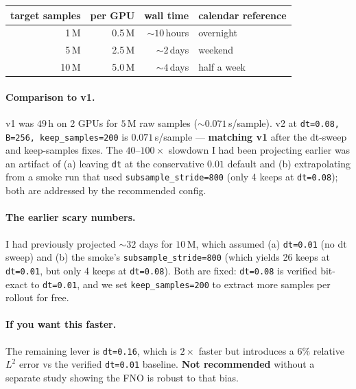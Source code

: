 \documentclass[11pt]{article}
\begin{document}
\begin{center}
\begin{tabular}{rrrl}
\toprule
target samples & per GPU & wall time & calendar reference \\
\midrule
1\,M  & 0.5\,M  & $\sim\!10$\,hours & overnight \\
5\,M  & 2.5\,M  & $\sim\!2$\,days   & weekend \\
10\,M & 5.0\,M  & $\sim\!4$\,days   & half a week \\
\bottomrule
\end{tabular}
\end{center}

\paragraph{Comparison to v1.} v1 was $49$\,h on 2 GPUs for $5$\,M raw samples
($\sim\!0.071$\,s/sample). v2 at \texttt{dt=0.08, B=256, keep\_samples=200} is
$0.071$\,s/sample --- \textbf{matching v1} after the dt-sweep and keep-samples
fixes. The $40$--$100\times$ slowdown I had been projecting earlier was an artifact
of (a) leaving \texttt{dt} at the conservative $0.01$ default and (b) extrapolating
from a smoke run that used \texttt{subsample\_stride=800} (only 4 keeps at \texttt{dt=0.08});
both are addressed by the recommended config.

\paragraph{The earlier scary numbers.} I had previously projected $\sim\!32$ days for
$10$\,M, which assumed (a) \texttt{dt=0.01} (no dt sweep) and (b) the smoke's
\texttt{subsample\_stride=800} (which yields 26 keeps at \texttt{dt=0.01}, but only
4 keeps at \texttt{dt=0.08}). Both are fixed: \texttt{dt=0.08} is verified bit-exact
to \texttt{dt=0.01}, and we set \texttt{keep\_samples=200} to extract more samples
per rollout for free.

\paragraph{If you want this faster.} The remaining lever is \texttt{dt=0.16},
which is $2\times$ faster but introduces a $6\%$ relative $L^2$ error vs the
verified \texttt{dt=0.01} baseline. \textbf{Not recommended} without a separate
study showing the FNO is robust to that bias.

\end{document}
